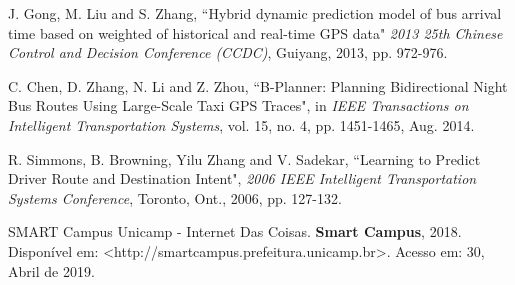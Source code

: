 \documentclass[11pt,twoside]{article}
\begin{document}
\begin{thebibliography}{99}

 J. Gong, M. Liu and S. Zhang, ``Hybrid dynamic prediction model of bus arrival time based on weighted of historical and real-time GPS data" \textit{2013 25th Chinese Control and Decision Conference (CCDC)}, Guiyang, 2013, pp. 972-976.

 C. Chen, D. Zhang, N. Li and Z. Zhou, ``B-Planner: Planning Bidirectional Night Bus Routes Using Large-Scale Taxi GPS Traces", in \textit{IEEE Transactions on Intelligent Transportation Systems}, vol. 15, no. 4, pp. 1451-1465, Aug. 2014.

 R. Simmons, B. Browning, Yilu Zhang and V. Sadekar, ``Learning to Predict Driver Route and Destination Intent", \textit{2006 IEEE Intelligent Transportation Systems Conference}, Toronto, Ont., 2006, pp. 127-132.

 SMART Campus Unicamp - Internet Das Coisas. \textbf{Smart Campus}, 2018. Disponível em: \textless http://smartcampus.prefeitura.unicamp.br\textgreater. Acesso em: 30, Abril de 2019.

\end{thebibliography}
\end{document}
